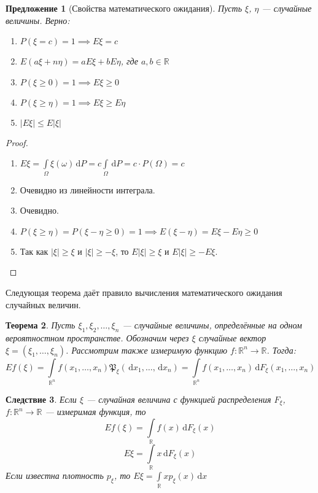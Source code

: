 \documentclass[11pt,openany,a4paper]{scrartcl}
\theoremstyle{plain}
\newtheorem{theorem}{Теорема}[subsection]
\newtheorem{corollary}[theorem]{Следствие}
\newtheorem{proposition}[theorem]{Предложение}
\theoremstyle{definition}
\newcommand\mb{\mathbb}
\newcommand\real{\mb R}
\newcommand{\dif}{\, \mathrm d}
\begin{document}
\begin{proposition}[Свойства математического ожидания]
Пусть $\xi$, $\eta$ — случайные величины. Верно:
    \begin{enumerate}
        \item $P(\xi = c) = 1 \implies E\xi = c$
        \item $E(a\xi + n\eta) = aE\xi + bE\eta$, где $a,b \in \real$
        \item $P(\xi \geqslant 0) = 1 \implies E\xi \geqslant 0$
        \item $P(\xi \geqslant \eta) = 1 \implies E\xi \geqslant E\eta$
        \item $|E\xi| \leqslant E|\xi|$
    \end{enumerate}
\end{proposition}
\begin{proof}
\mbox{}
    \begin{enumerate}
        \item $E\xi = \int\limits_\Omega\xi(\omega)\dif P =
        c\int\limits_\Omega \dif P = c\cdot P(\Omega) = c$
        \item Очевидно из линейности интеграла.
        \item Очевидно.
        \item $P(\xi \geqslant \eta) = P(\xi - \eta \geqslant 0) = 1 \implies
        E(\xi - \eta) = E\xi - E\eta \geqslant 0$
        \item Так как $|\xi| \geqslant \xi$ и $|\xi| \geqslant - \xi$, то
        $E|\xi| \geqslant\xi$ и $E|\xi| \geqslant - E\xi$.
    \end{enumerate}
\end{proof}

Следующая теорема даёт правило вычисления математического ожидания случайных
величин.

\begin{theorem}
    Пусть $\xi_1, \xi_2, \ldots, \xi_n$ — случайные величины, определённые на
    одном вероятностном пространстве. Обозначим через $\xi$ случайные вектор
    $\xi = (\xi_1, \ldots, \xi_n)$. Рассмотрим также измеримую функцию
    $f: \real^n \to \real$. Тогда:
    $$
    Ef(\xi) = \int\limits_{\real^n} f(x_1, \ldots, x_n)
    \mathfrak P_\xi (\dif x_1, \ldots, \dif x_n) =
    \int\limits_{\real^n} f(x_1, \ldots, x_n) \dif F_\xi(x_1, \ldots, x_n)
    $$
\end{theorem}
\begin{corollary}
    Если $\xi$ — случайная величина с функцией распределения $F_\xi$,
    $f: \real^n \to \real$ — измеримая функция, то
    $$
    Ef(\xi) = \int\limits_\real f(x) \dif F_\xi(x)
    $$
    $$
    E\xi = \int\limits_\real x \dif F_\xi(x)
    $$
    Если известна плотность $p_\xi$, то $E\xi = \int\limits_\real xp_\xi(x)\dif x$
\end{corollary}
\end{document}
